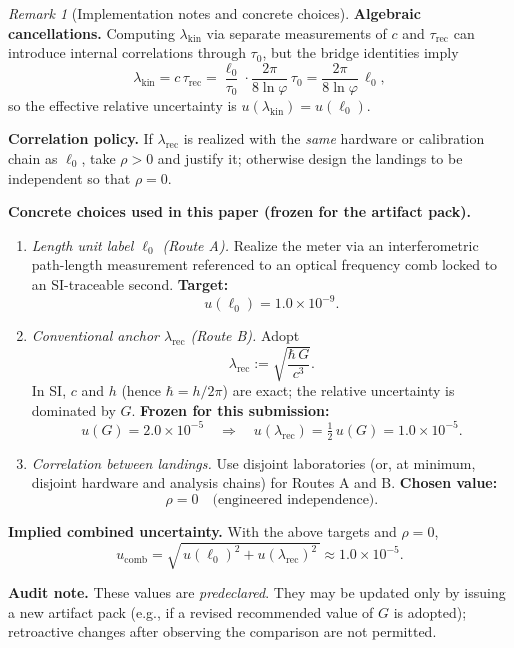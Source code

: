 \documentclass[11pt]{article}
\theoremstyle{plain}
\theoremstyle{definition}
\theoremstyle{remark}
\newtheorem*{remark}{Remark}
\begin{document}
\begin{remark}[Implementation notes and concrete choices]
\textbf{Algebraic cancellations.} Computing \(\lambda_{\mathrm{kin}}\) via separate measurements of \(c\) and \(\tau_{\mathrm{rec}}\) can introduce internal correlations through \(\tau_{0}\), but the bridge identities imply
\[
\lambda_{\mathrm{kin}}=c\,\tau_{\mathrm{rec}}=\frac{\ell_{0}}{\tau_{0}}\cdot\frac{2\pi}{8\ln\varphi}\,\tau_{0}=\frac{2\pi}{8\ln\varphi}\,\ell_{0},
\]
so the effective relative uncertainty is \(u(\lambda_{\mathrm{kin}})=u(\ell_{0})\).

\textbf{Correlation policy.} If \(\lambda_{\mathrm{rec}}\) is realized with the \emph{same} hardware or calibration chain as \(\ell_{0}\), take \(\rho>0\) and justify it; otherwise design the landings to be independent so that \(\rho=0\).

\medskip
\noindent\textbf{Concrete choices used in this paper (frozen for the artifact pack).}
\begin{enumerate}
  \item \emph{Length unit label \(\ell_{0}\) (Route A).} Realize the meter via an interferometric path-length measurement referenced to an optical frequency comb locked to an SI-traceable second. \textbf{Target:}
  \[
  u(\ell_{0})=1.0\times10^{-9}.
  \]
  \item \emph{Conventional anchor \(\lambda_{\mathrm{rec}}\) (Route B).} Adopt
  \[
  \lambda_{\mathrm{rec}}:=\sqrt{\frac{\hbar\,G}{c^{3}}}.
  \]
  In SI, \(c\) and \(h\) (hence \(\hbar=h/2\pi\)) are exact; the relative uncertainty is dominated by \(G\). \textbf{Frozen for this submission:}
  \[
  u(G)=2.0\times10^{-5}\quad\Longrightarrow\quad u(\lambda_{\mathrm{rec}})=\tfrac12\,u(G)=1.0\times10^{-5}.
  \]
  \item \emph{Correlation between landings.} Use disjoint laboratories (or, at minimum, disjoint hardware and analysis chains) for Routes A and B. \textbf{Chosen value:}
  \[
  \rho=0\quad\text{(engineered independence)}.
  \]
\end{enumerate}

\textbf{Implied combined uncertainty.} With the above targets and \(\rho=0\),
\[
u_{\mathrm{comb}}=\sqrt{\,u(\ell_{0})^{2}+u(\lambda_{\mathrm{rec}})^{2}\,}\approx 1.0\times10^{-5}.
\]

\textbf{Audit note.} These values are \emph{predeclared}. They may be updated only by issuing a new artifact pack (e.g., if a revised recommended value of \(G\) is adopted); retroactive changes after observing the comparison are not permitted.
\end{remark}
\end{document}

